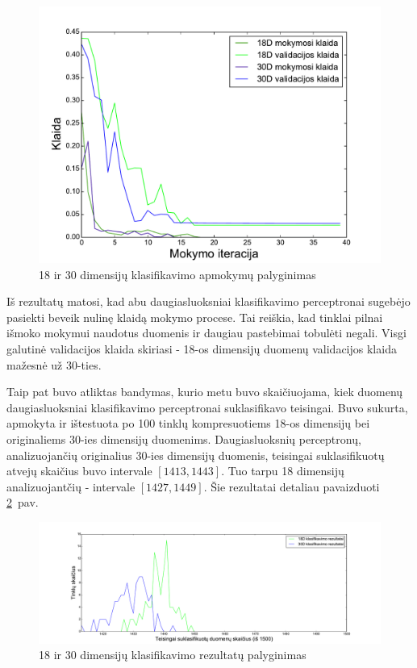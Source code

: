 \documentclass{VUMIFPSbakalaurinis}
\begin{document}
\begin{figure}
	\includegraphics[scale=0.75]{pics/dim_comparisons_2015-5-27_14-21-13}
	\caption{18 ir 30 dimensijų klasifikavimo apmokymų palyginimas}
	\label{fig:dim-comparisons}
\end{figure}

Iš rezultatų matosi, kad abu daugiasluoksniai klasifikavimo perceptronai sugebėjo pasiekti beveik nulinę klaidą mokymo procese.
Tai reiškia, kad tinklai pilnai išmoko mokymui naudotus duomenis ir daugiau pastebimai tobulėti negali.
Visgi galutinė validacijos klaida skiriasi - 18-os dimensijų duomenų validacijos klaida mažesnė už 30-ties.

Taip pat buvo atliktas bandymas, kurio metu buvo skaičiuojama, kiek duomenų daugiasluoksniai klasifikavimo perceptronai suklasifikavo teisingai.
Buvo sukurta, apmokyta ir ištestuota po 100 tinklų kompresuotiems 18-os dimensijų bei originaliems 30-ies dimensijų duomenims.
Daugiasluoksnių perceptronų, analizuojančių originalius 30-ies dimensijų duomenis, teisingai suklasifikuotų atvejų skaičius buvo intervale $[1413, 1443]$.
Tuo tarpu 18 dimensijų analizuojantčių - intervale $[1427, 1449]$.
Šie rezultatai detaliau pavaizduoti \ref{fig:correct-count}~pav.

\begin{figure}
	\includegraphics[scale=0.35]{pics/correct}
	\caption{18 ir 30 dimensijų klasifikavimo rezultatų palyginimas}
	\label{fig:correct-count}
\end{figure}
\end{document}
